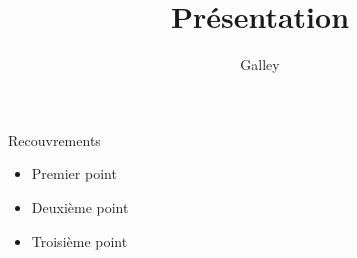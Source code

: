 \documentclass{beamer}
\title{Présentation}
\author{Galley}
\begin{document}
\begin{frame}
  \titlepage
\end{frame}
\begin{frame}{Recouvrements}
  \begin{itemize}
    \item<1-> Premier point
    \item<2-> Deuxième point
    \item<3-> Troisième point
  \end{itemize}
\end{frame}
\end{document}
